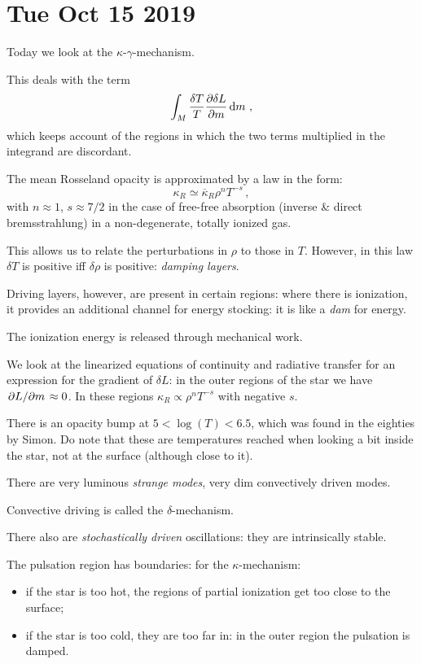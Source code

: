 \documentclass[main.tex]{subfiles}
\begin{document}
\section*{Tue Oct 15 2019}

Today we look at the \(\kappa \)-\(\gamma \)-mechanism.

This deals with the term 
%
\begin{equation}
  \int_M \frac{\delta T}{T} \pdv{\delta L}{m} \dd{m} 
\,,
\end{equation}
%
which keeps account of the regions in which the two terms multiplied in the integrand are discordant.

The mean Rosseland opacity is approximated by a law in the form: 
%
\begin{equation}
  \kappa _R \simeq \overline{\kappa }_R \rho^{n} T^{-s}      
\,,
\end{equation}
%
with \(n \approx 1\), \(s \approx 7/2\) in the case of free-free absorption (inverse \& direct bremsstrahlung) in a non-degenerate, totally ionized gas.

This allows us to relate the perturbations in \(\rho \) to those in \(T\). However, in this law \(\delta T\) is positive iff \(\delta \rho \) is positive: \emph{damping layers}.

Driving layers, however, are present in certain regions: where there is ionization, it provides an additional channel for energy stocking: it is like a \emph{dam} for energy.

The ionization energy is released through mechanical work.

We look at the linearized equations of continuity and radiative transfer for an expression for the gradient of \(\delta L\): in the outer regions of the star we have \(\pdv*{L}{m} \approx 0\). 
In these regions \(\kappa _R \propto \rho^{n}T^{-s}\) with negative \(s\).

There is an opacity bump at \(5<\log(T)< 6.5 \), which was found in the eighties by Simon.
Do note that these are temperatures reached when looking a bit inside the star, not at the surface (although close to it).

There are very luminous \emph{strange modes}, very dim convectively driven modes.

Convective driving is called the \(\delta \)-mechanism.

There also are \emph{stochastically driven} oscillations: they are intrinsically stable.

The pulsation region has boundaries:
for the \(\kappa \)-mechanism:
\begin{itemize}
    \item if the star is too hot, the regions of partial ionization get too close to the surface;
    \item if the star is too cold, they are too far in: in the outer region the pulsation is damped.
\end{itemize}
\end{document}

